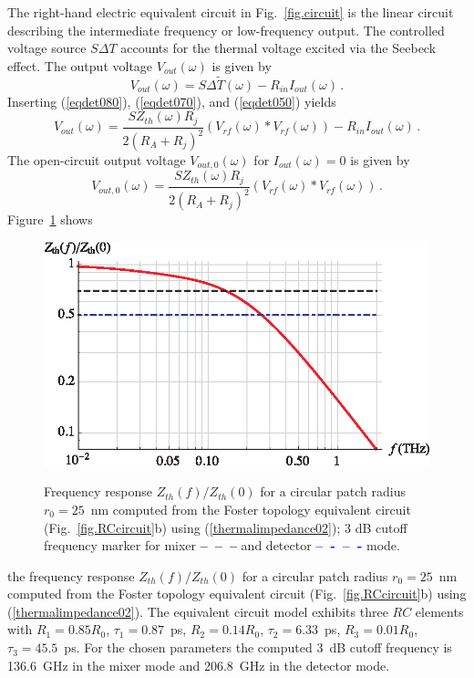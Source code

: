 \documentclass[journal]{IEEEtran}
\begin{document}
The right-hand electric equivalent circuit in Fig.~\ref{fig.circuit} is the linear circuit describing the intermediate frequency or low-frequency output. The controlled voltage source $S \Delta T$ accounts for the thermal voltage excited via the Seebeck effect. The output voltage $V_{out}(\omega)$ is given by
%
\begin{equation}	\label{eqdet090}
	V_{out}(\omega) = S \Delta \tilde{T}(\omega) - R_{in} I_{out} (\omega)\, .
\end{equation}
%
Inserting (\ref{eqdet080}),  (\ref{eqdet070}), and (\ref{eqdet050}) yields
%
\begin{equation}	\label{eqdet100}
	V_{out}(\omega) =  \frac{S  Z_{th}(\omega) R_j}{2(R_A+R_j )^2} \left(V_{rf}(\omega)  \ast V_{rf}(\omega)  \right)  - R_{in} I_{out} (\omega)\, .
\end{equation}
%
The open-circuit output voltage $V_{out,0}(\omega)$ for $I_{out} (\omega)=0$ is given by
%
\begin{equation}	\label{eqdet110}
	V_{out,0}(\omega) =  \frac{S  Z_{th}(\omega) R_j}{2(R_A+R_j )^2} \left(V_{rf}(\omega) \ast V_{rf}(\omega)  \right) \, .
\end{equation}
%
Figure~\ref{fresponsec01} shows 
%
\begin{figure}[h]
\centering
\includegraphics[width=1.0\columnwidth,clip]{figures/fresponsec01n.eps} \\
\caption{Frequency response $Z_{th}(f)/Z_{th}(0)$ for a circular patch radius $r_0 =25$~nm computed from the Foster topology equivalent circuit (Fig.~\ref{fig.RCcircuit}b) using (\ref{thermalimpedance02}); 3 dB cutoff frequency marker for mixer \textcolor{black}{\bf --~--~--} and detector \textcolor{blue}{\bf --~-~--~-} mode.} 
\label{fresponsec01}
\end{figure}
%
the frequency response $Z_{th}(f)/Z_{th}(0)$ for a circular patch radius $r_0 =25$~nm computed from the Foster topology equivalent circuit (Fig.~\ref{fig.RCcircuit}b) using (\ref{thermalimpedance02}). 
The equivalent circuit model exhibits three $RC$ elements with $R_1=0.85 R_0$, $\tau_1 = 0.87$~ps,  $R_2=0.14 R_0$, $\tau_2 = 6.33$~ps, $R_3=0.01 R_0$, $\tau_3 = 45.5$~ps. For the chosen parameters the computed 3~dB cutoff frequency is 136.6~GHz in the mixer mode and 206.8~GHz in the detector mode.
%
\end{document}
